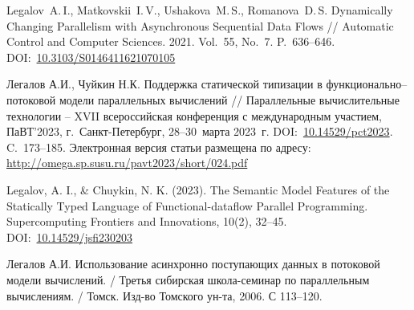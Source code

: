 \begin{thebibliography}{00}
Legalov~A.\,I., Matkovskii~I.\,V., Ushakova~M.\,S., Romanova~D.\,S. Dynamically Changing Parallelism with Asynchronous Sequential Data Flows // Automatic Control and Computer Sciences. 2021. Vol.~55, No.~7. P.~636--646. DOI:~\href{https://doi.org/10.3103/S0146411621070105}{10.3103/S0146411621070105}

Легалов А.И., Чуйкин Н.К. Поддержка статической типизации в функционально–потоковой модели параллельных вычислений // Параллельные вычислительные технологии – XVII всероссийская конференция с международным участием, ПаВТ'2023, г. Санкт-Петербург, 28–30 марта 2023 г. DOI:~\href{https://doi.org/10.14529/pct2023}{10.14529/pct2023}. C. 173–185. Электронная версия статьи размещена по адресу: \href{http://omega.sp.susu.ru/pavt2023/short/024.pdf}{http://omega.sp.susu.ru/pavt2023/short/024.pdf}

Legalov, A. I., \& Chuykin, N. K. (2023). The Semantic Model Features of the Statically Typed Language of Functional-dataflow Parallel Programming. Supercomputing Frontiers and Innovations, 10(2), 32–45. DOI:~\href{https://doi.org/10.14529/jsfi230203}{10.14529/jsfi230203}

Легалов А.И. Использование асинхронно поступающих данных в потоковой модели вычислений. / Третья сибирская школа-семинар по параллельным вычислениям. / Томск. Изд-во Томского ун-та, 2006. С 113--120.

\end{thebibliography}
